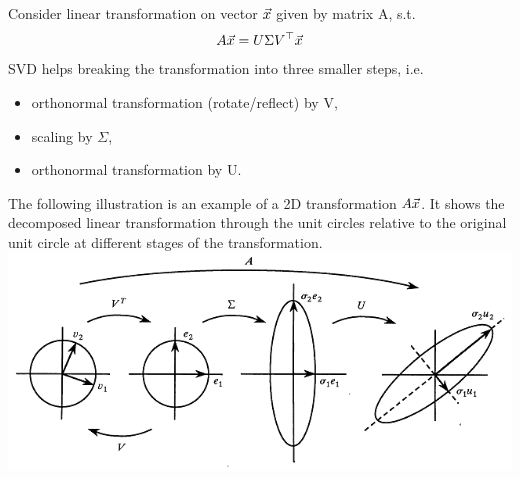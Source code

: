 \begin{remark}
	Consider linear transformation on vector $\vec{x}$ given by matrix A, s.t.
	\[
	A\vec{x} = U \Sigma V^\top \vec{x}
	\]
	SVD helps breaking the transformation into three smaller steps, i.e.
	\begin{itemize}
		\item orthonormal transformation (rotate/reflect) by V,
		\item scaling by $\Sigma$,
		\item orthonormal transformation by U.
	\end{itemize}
	The following illustration is an example of a 2D transformation $A\vec{x}$. It shows the decomposed linear transformation through the unit circles relative to the original unit circle at different stages of the transformation.\\
	\includegraphics[scale=0.7]{img/svd1.png}
\end{remark}

